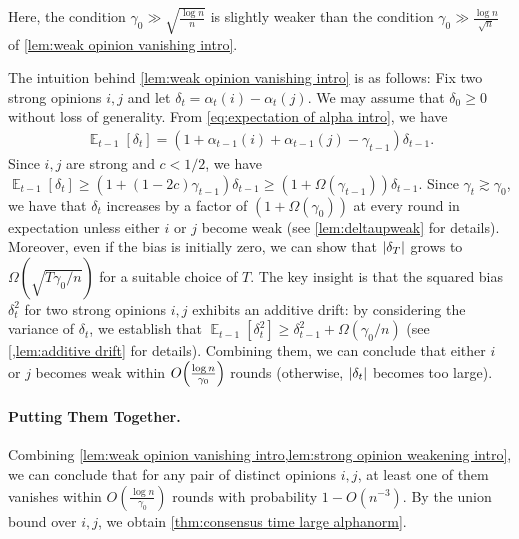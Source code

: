 \documentclass[letterpaper,11pt]{article}
\DeclareMathOperator*{\E}{\mathbb{E}}
\DeclareMathOperator*{\Var}{\mathbf{Var}}
\newcommand{\alphanorm}{\gamma}
\begin{document}
Here, the condition $\alphanorm_0 \gg \sqrt{\frac{\log n}{n}}$ is slightly weaker than the condition $\alphanorm_0\gg\frac{\log n}{\sqrt{n}}$ of \cref{lem:weak opinion vanishing intro}.

The intuition behind \cref{lem:weak opinion vanishing intro} is as follows:
Fix two strong opinions $i,j$ and let $\delta_t = \alpha_t(i) - \alpha_t(j)$.
We may assume that $\delta_0 \geq  0$ without loss of generality.
From \cref{eq:expectation of alpha intro}, we have
\begin{align}
  \E_{t-1}[\delta_t] = (1+\alpha_{t-1}(i) + \alpha_{t-1}(j) - \alphanorm_{t-1}) \delta_{t-1} \label{eq:expectation of delta intro}.
\end{align}
Since $i,j$ are strong and $c<1/2$, we have $\E_{t-1}[\delta_t] \ge (1+(1-2c)\alphanorm_{t-1}) \delta_{t-1} \ge (1+\Omega(\alphanorm_{t-1}))\delta_{t-1}$.
Since $\alphanorm_t \gtrsim \alphanorm_0$, we have that $\delta_t$ increases by a factor of $(1+\Omega(\alphanorm_0))$ at every round in expectation unless either $i$ or $j$ become weak (see \cref{lem:deltaupweak} for details).
%
Moreover, even if the bias is initially zero, we can show that $\abs{\delta_T}$ grows to $\Omega(\sqrt{T\alphanorm_0/n})$ for a suitable choice of $T$.
The key insight is that the squared bias $\delta_t^2$ for two strong opinions $i,j$ exhibits an additive drift: by considering the variance of $\delta_t$, we establish that $\E_{t-1}[\delta_t^2]\geq \delta_{t-1}^2+\Omega(\alphanorm_0/n)$ (see \cref{,lem:additive drift} for details).
%
%
%
Combining them, we can conclude that either $i$ or $j$ becomes weak within $O\qty(\frac{\log n}{\alphanorm_0})$ rounds (otherwise, $\abs{\delta_t}$ becomes too large).

\paragraph*{Putting Them Together.}
Combining \cref{lem:weak opinion vanishing intro,lem:strong opinion weakening intro},
we can conclude that for any pair of distinct opinions $i,j$, at least one of them vanishes within \(O\left(\frac{\log n}{\alphanorm_0}\right)\) rounds with probability \(1-O(n^{-3})\).
By the union bound over $i,j$, we obtain \cref{thm:consensus time large alphanorm}.
\end{document}
